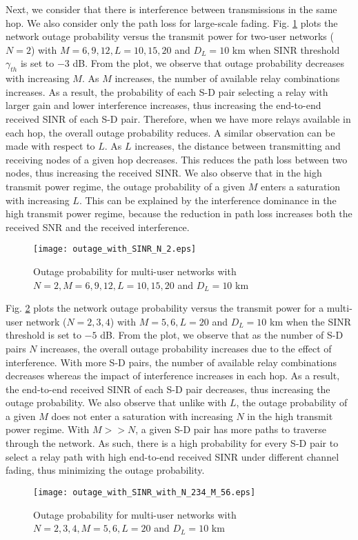 \documentclass[12pt,draftclsnofoot,onecolumn]{IEEEtran}
\begin{document}
	Next, we consider that there is interference between transmissions in the same hop. We also consider only the path loss for large-scale fading. Fig. \ref{figure4} plots the network outage probability versus the transmit power for two-user networks ($N=2$) with $M=6,9,12, L=10,15,20$ and $D_L=10$ km when SINR threshold $\gamma_{th}$ is set to $-3$ dB. From the plot, we observe that outage probability decreases with increasing $M$. As $M$ increases, the number of available relay combinations increases. As a result, the probability of each S-D pair selecting a relay with larger gain and lower interference increases, thus increasing the end-to-end received SINR of each S-D pair. Therefore, when we have more relays available in each hop, the overall outage probability reduces. A similar observation can be made with respect to $L$. As $L$ increases, the distance between transmitting and receiving nodes of a given hop decreases. This reduces the path loss between two nodes, thus increasing the received SINR. We also observe that in the high transmit power regime, the outage probability of a given $M$ enters a saturation with increasing $L$. This can be explained by the interference dominance in the high transmit power regime, because the reduction in path loss increases both the received SNR and the received interference.	
	\begin{figure}
		\centering
		\texttt{[image: outage\_with\_SINR\_N\_2.eps]}
		\centering\caption{Outage probability for multi-user networks with $N=2, M=6,9,12, L=10,15,20$ and $D_L=10$ km}
		\label{figure4}
	\end{figure} 
	
	Fig. \ref{figure5} plots the network outage probability versus the transmit power for a multi-user network ($N=2,3,4$) with $M=5,6, L=20$ and $D_L=10$ km when the SINR threshold is set to $-5$ dB. From the plot, we observe that as the number of S-D pairs $N$ increases, the overall outage probability increases due to the effect of interference. With more S-D pairs, the number of available relay combinations decreases whereas the impact of interference increases in each hop. As a result, the end-to-end received SINR of each S-D pair decreases, thus increasing the outage probability. We also observe that unlike with $L$, the outage probability of a given $M$ does not enter a saturation with increasing $N$ in the high transmit power regime. With $M >> N$, a given S-D pair has more paths to traverse through the network. As such, there is a high probability for every S-D pair to select a relay path with high end-to-end received SINR under different channel fading, thus minimizing the outage probability.
	\begin{figure}
		\centering
		\texttt{[image: outage\_with\_SINR\_with\_N\_234\_M\_56.eps]}
		\centering\caption{Outage probability for multi-user networks with $N=2,3,4, M=5,6, L=20$ and $D_L=10$ km}
		\label{figure5}
	\end{figure}  	 
	
\end{document}
